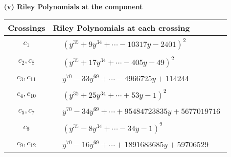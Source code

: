 \documentclass[1p]{elsarticle_modified}
\theoremstyle{definition}
\begin{document}
\newpage\renewcommand{\arraystretch}{1}
\flushleft \textbf{(v) Riley Polynomials at the component}\newline \\
\begin{tabular}{m{50pt}|m{274pt}}
Crossings & \hspace{64pt}Riley Polynomials at each crossing \\
\hline $$\begin{aligned}c_{1}\end{aligned}$$&$\begin{aligned}
&(y^{35}+9 y^{34}+\cdots-10317 y-2401)^{2}
\end{aligned}$\\
\hline $$\begin{aligned}c_{2},c_{8}\end{aligned}$$&$\begin{aligned}
&(y^{35}+17 y^{34}+\cdots-405 y-49)^{2}
\end{aligned}$\\
\hline $$\begin{aligned}c_{3},c_{11}\end{aligned}$$&$\begin{aligned}
&y^{70}-33 y^{69}+\cdots-4966725 y+114244
\end{aligned}$\\
\hline $$\begin{aligned}c_{4},c_{10}\end{aligned}$$&$\begin{aligned}
&(y^{35}+25 y^{34}+\cdots+53 y-1)^{2}
\end{aligned}$\\
\hline $$\begin{aligned}c_{5},c_{7}\end{aligned}$$&$\begin{aligned}
&y^{70}-34 y^{69}+\cdots+95484723835 y+5677019716
\end{aligned}$\\
\hline $$\begin{aligned}c_{6}\end{aligned}$$&$\begin{aligned}
&(y^{35}-8 y^{34}+\cdots-34 y-1)^{2}
\end{aligned}$\\
\hline $$\begin{aligned}c_{9},c_{12}\end{aligned}$$&$\begin{aligned}
&y^{70}-16 y^{69}+\cdots+1891683685 y+59706529
\end{aligned}$\\
\hline
\end{tabular}\\~\\
\end{document}
